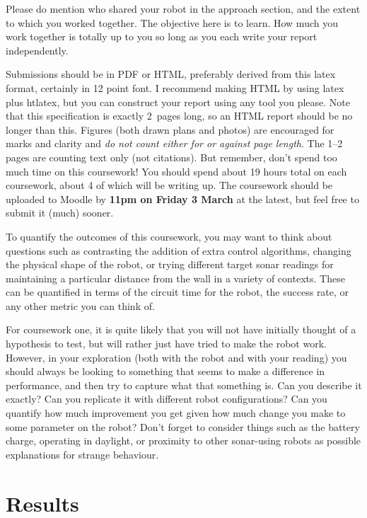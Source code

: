 \documentclass[a4paper,12pt]{article}
\begin{document}
Please do mention who shared your robot in the approach section, and
the extent to which you worked together.  The objective here is to
learn.  How much you work together is totally up to you so long as you
each write your report independently.

Submissions should be in PDF or HTML, preferably derived from this
latex format, certainly in 12 point font.  I recommend making HTML by
using latex plus htlatex, but you can construct your report using any
tool you please.  Note that this specification is exactly 2~pages
long, so an HTML report should be no longer than this.
Figures (both drawn plans and photos) are encouraged for marks and
clarity and {\em do not count either for or against page length}.  The
1--2 pages are counting text only (not citations).  But remember, don't spend too much
time on this coursework!  You should spend about 19 hours total on
each coursework, about 4 of which will be writing up.  The coursework
should be uploaded to Moodle by {\bf 11pm on Friday 3 March} at the
latest, but feel free to submit it (much) sooner.


To quantify the outcomes of this coursework, you may want to think
about questions such as contrasting the addition of extra control
algorithms,  changing the physical shape of the robot,  or trying different target
sonar readings for maintaining a particular distance from the wall in
a variety of contexts. These can be quantified in terms of 
the circuit time for the robot, the success rate, or any other metric
you can think of. 

For coursework one, it is quite likely that you will not have initially
thought of a hypothesis to test, but will rather just have tried to
make the robot work.  However, in your exploration (both with the
robot and with your reading) you should always be looking to something
that seems to make a difference in performance, and then try to
capture what that something is.  Can you describe it exactly?  Can you
replicate it with different robot configurations?  Can you quantify
how much improvement you get given how much change you make to some
parameter on the robot?  Don't forget to consider things such as the
battery charge, operating in daylight, or proximity to other
sonar-using robots as possible explanations for strange behaviour.


\section{Results}
\end{document}
